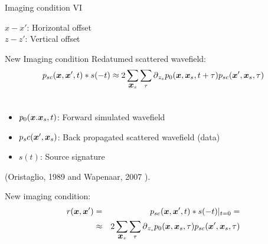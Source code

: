 \documentclass[xcolor=dvipsnames]{beamer}
\begin{document}
\begin{frame}{Imaging condition VI}
\begin{figure}
\end{figure}

$x-x'$: Horizontal offset \\
$z-z'$: Vertical offset 
\end{frame}
\begin{frame}{New Imaging condition}
Redatumed scattered wavefield: 
\begin{eqnarray}
  p_{sc}(\mbox{\boldmath $x$},\mbox{\boldmath $x$}',t)*s(-t) 
   \approx 2\sum_{\mbox{\boldmath $x$}_s}\sum_{\tau}\mbox{$\partial$}_{z_s} p_0(\mbox{\boldmath $x$},\mbox{\boldmath $x$}_s,t+\tau)p_{sc}(\mbox{\boldmath $x$}',\mbox{\boldmath $x$}_s,\tau)\nonumber\\ 
                       \nonumber
\end{eqnarray}
\begin{itemize}
\item $p_0(\mbox{\boldmath $x$}.\mbox{\boldmath $x$}_s,t)$: Forward simulated wavefield
\item $p_sc(\mbox{\boldmath $x$}',\mbox{\boldmath $x$}_s)$: Back propagated scattered wavefield (data)
\item $s(t)$: Source signature
\end{itemize}
(Oristaglio, 1989\cite{Oristaglio1989} and Wapenaar, 2007 \cite{Wapenaar2007}).

\vspace{1cm}
New imaging condition:
\begin{eqnarray}
  r(\mbox{\boldmath $x$},\mbox{\boldmath $x$}')\nonumber & = & 
  p_{sc}(\mbox{\boldmath $x$},\mbox{\boldmath $x$}',t)*s(-t)|_{t=0} =\nonumber\\ 
   &\approx& 2\sum_{\mbox{\boldmath $x$}_s}\sum_{\tau}\mbox{$\partial$}_{z_s} p_0(\mbox{\boldmath $x$},\mbox{\boldmath $x$}_s,\tau)p_{sc}(\mbox{\boldmath $x$}',\mbox{\boldmath $x$}_s,\tau)\nonumber\\ 
                       \nonumber
\end{eqnarray}
\end{frame}
\end{document}
